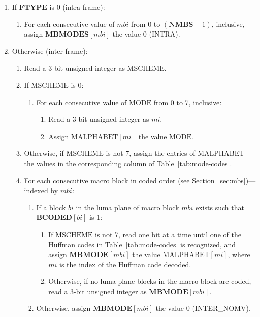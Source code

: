 \documentclass[11pt,letterpaper]{book}
\newcommand{\idx}[1]{{\ensuremath{\mathit{#1}}}}
\newcommand{\bi}{\idx{bi}}
\newcommand{\mbi}{\idx{mbi}}
\newcommand{\mi}{\idx{mi}}
\newcommand{\bitvar}[1]{\ensuremath{\mathbf{\bm #1}}}
\newcommand{\locvar}[1]{\ensuremath{\mathrm{#1}}}
\numberwithin{equation}{chapter}
\numberwithin{figure}{chapter}
\numberwithin{table}{chapter}
\begin{document}
\begin{enumerate}
\item
If \bitvar{FTYPE} is 0 (intra frame):
\begin{enumerate}
\item
For each consecutive value of \locvar{\mbi} from 0 to $(\bitvar{NMBS}-1)$,
 inclusive, assign $\bitvar{MBMODES}[\mbi]$ the value 0 (INTRA).
\end{enumerate}
\item
Otherwise (inter frame):
\begin{enumerate}
\item
Read a 3-bit unsigned integer as \locvar{MSCHEME}.
\item
If \locvar{MSCHEME} is 0:
\begin{enumerate}
\item
For each consecutive value of \locvar{MODE} from 0 to 7, inclusive:
\begin{enumerate}
\item
Read a 3-bit unsigned integer as \locvar{\mi}.
\item
Assign $\locvar{MALPHABET}[\mi]$ the value \locvar{MODE}.
\end{enumerate}
\end{enumerate}
\item
Otherwise, if \locvar{MSCHEME} is not 7, assign the entries of
 \locvar{MALPHABET} the values in the corresponding column of
 Table~\ref{tab:mode-codes}.
\item
For each consecutive macro block in coded order (see
 Section~\ref{sec:mbs})---indexed by \locvar{\mbi}:
\begin{enumerate}
\item
If a block \locvar{\bi} in the luma plane of macro block \locvar{\mbi} exists
 such that $\bitvar{BCODED}[\locvar{\bi}]$ is 1:
\begin{enumerate}
\item
If \locvar{MSCHEME} is not 7, read one bit at a time until one of the Huffman
 codes in Table~\ref{tab:mode-codes} is recognized, and assign
 $\bitvar{MBMODE}[\locvar{\mbi}]$ the value $\locvar{MALPHABET}[\locvar{\mi}]$,
 where \locvar{\mi} is the index of the Huffman code decoded.
\item
Otherwise, if no luma-plane blocks in the macro block are coded, read a 3-bit
 unsigned integer as $\bitvar{MBMODE}[\locvar{\mbi}]$.
\end{enumerate}
\item
Otherwise, assign $\bitvar{MBMODE}[\locvar{\mbi}]$ the value 0 (INTER\_NOMV).
\end{enumerate}
\end{enumerate}
\end{enumerate}
\end{document}
